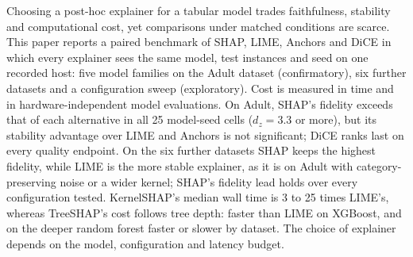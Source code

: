 Choosing a post-hoc explainer for a tabular model trades faithfulness, stability and
computational cost, yet comparisons under matched conditions are scarce. This paper reports
a paired benchmark of SHAP, LIME, Anchors and DiCE in which every explainer sees the same
model, test instances and seed on one recorded host: five model families on the Adult
dataset (confirmatory), six further datasets and a configuration sweep (exploratory). Cost
is measured in time and in hardware-independent model evaluations. On Adult,
SHAP's fidelity exceeds that of each alternative in all 25 model-seed cells ($d_z{=}3.3$ or
more), but its stability advantage over LIME and Anchors is not significant; DiCE ranks last
on every quality endpoint. On the six further datasets SHAP keeps the highest fidelity,
while LIME is the more stable explainer, as it is on Adult with category-preserving
noise or a wider kernel; SHAP's fidelity lead holds over every configuration tested. KernelSHAP's median wall time is 3 to 25 times LIME's,
whereas TreeSHAP's cost follows tree depth: faster than LIME on XGBoost, and on the deeper
random forest faster or slower by dataset. The choice of explainer depends on the model, configuration and
latency budget.
